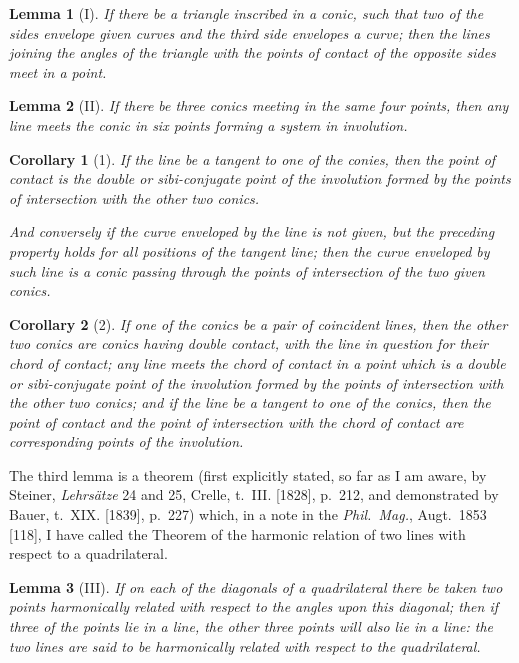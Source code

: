 \documentclass[11pt,a4paper]{book}
\newtheorem*{lemma}{Lemma}
\newtheorem*{corollary}{Corollary}
\begin{document}
\begin{lemma}[I]
If there be a triangle inscribed in a conic, such that two of the sides envelope given curves and the third side envelopes a curve; then the lines joining the angles of the triangle with the points of contact of the opposite sides meet in a point.
\end{lemma}

\begin{lemma}[II]
If there be three conics meeting in the same four points, then any line meets the conic in six points forming a system in involution.
\end{lemma}

\begin{corollary}[1]
If the line be a tangent to one of the conies, then the point of contact is the double or sibi-conjugate point of the involution formed by the points of intersection with the other two conics.

And conversely if the curve enveloped by the line is not given, but the preceding property holds for all positions of the tangent line; then the curve enveloped by such line is a conic passing through the points of intersection of the two given conics.
\end{corollary}

\begin{corollary}[2]
If one of the conics be a pair of coincident lines, then the other two conics are conics having double contact, with the line in question for their chord of contact; any line meets the chord of contact in a point which is a double or sibi-conjugate point of the involution formed by the points of intersection with the other two conics; and if the line be a tangent to one of the conics, then the point of contact and the point of intersection with the chord of contact are corresponding points of the involution.
\end{corollary}

\newpage
The third lemma is a theorem (first explicitly stated, so far as I am aware, by Steiner, \textit{Lehrs\"{a}tze} 24 and 25, Crelle, t.~III. [1828], p.~212, and demonstrated by Bauer, t.~XIX. [1839], p.~227) which, in a note in the \textit{Phil.\ Mag.}, Augt.\ 1853 [118], I have called the Theorem of the harmonic relation of two lines with respect to a quadrilateral.

\begin{lemma}[III]
If on each of the diagonals of a quadrilateral there be taken two points harmonically related with respect to the angles upon this diagonal; then if three of the points lie in a line, the other three points will also lie in a line: the two lines are said to be harmonically related with respect to the quadrilateral.
\end{lemma}
\end{document}
